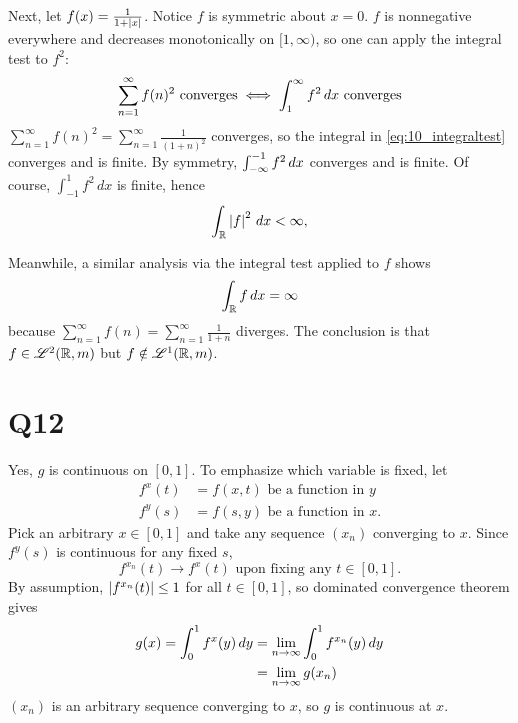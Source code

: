 \documentclass[12pt]{article}
\begin{document}
Next, let $f(x) = \frac{1}{1 + \abs{x}}$. 
Notice $f$ is symmetric about $x = 0$. 
$f$ is nonnegative everywhere and decreases monotonically on $[1, \infty)$, so one can apply the integral test to $f^2$: 
\begin{equation} \label{eq:10_integraltest} 
  \sum_{n = 1}^{\infty} f(n)^2 \text{ converges} \iff \integral{1}{\infty}{x}{f^2} \text{ converges}
\end{equation}
$\sum_{n = 1}^{\infty} f(n)^2 = \sum_{n = 1}^{\infty} \frac{1}{(1 + n)^2}$ converges, so the integral in \eqref{eq:10_integraltest} converges and is finite.  
By symmetry, $\integral{-\infty}{-1}{x}{f^2}$ converges and is finite. 
Of course, $\int_{-1}^{1} f^2 \, dx$ is finite, hence 
$$\int_{\R} \abs{f}^2 \, dx < \infty,$$

Meanwhile, a similar analysis via the integral test applied to $f$ shows 
$$\int_{\R} f \, dx = \infty$$
because $\sum_{n = 1}^{\infty} f(n) = \sum_{n = 1}^{\infty} \frac{1}{1 + n}$ diverges. 
The conclusion is that $f \in \Ltwospace{\R}{m}$ but $f \notin \Lonespace{\R}{m}$. 

\section*{Q12} 
Yes, $g$ is continuous on $[0, 1]$. 
To emphasize which variable is fixed, let 
\begin{align*}
  f^{x}(t) & = f(x, t) \text{ be a function in } y \\ 
  f^{y}(s) & = f(s, y) \text{ be a function in } x.
\end{align*}
Pick an arbitrary $x \in [0, 1]$ and take any sequence $(x_n)$ converging to $x$. 
Since $f^{y}(s)$ is continuous for any fixed $s$, 
$$f^{x_n}(t) \rightarrow f^{x}(t) \text{ upon fixing any } t \in [0, 1].$$
By assumption, $\abs{f^{x_n}(t)} \leq 1$ for all $t \in [0, 1]$, so dominated convergence theorem gives 
\begin{align*}
  g(x) = \integral{0}{1}{y}{f^{x}(y)}  
  & = \lim_{n \rightarrow \infty} \integral{0}{1}{y}{f^{x_n}(y)} \\ 
  & = \lim_{n \rightarrow \infty} g(x_n)
\end{align*}
$(x_n)$ is an arbitrary sequence converging to $x$, so $g$ is continuous at $x$. 
\end{document}
